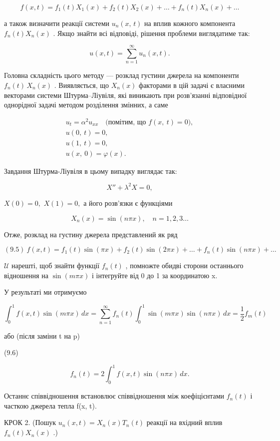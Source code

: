 \documentclass[
  ukrainian,
]{article}
\begin{document}
\[
f(x, t) = f_1(t) X_1(x) + f_2(t) X_2(x) + \dots + f_n(t) X_n(x) + \dots
\]

а також визначити реакції системи \(u_n\left(x,\,t\right)\) на вплив
кожного компонента \(f_n\left(t\right)X_n\left(x\right)\) . Якщо знайти
всі відповіді, рішення проблеми виглядатиме так:

\[
u(x, t) = \sum_{n=1}^{\infty} u_n(x, t).
\]

Головна складність цього методу --- розклад густини джерела на
компоненти \(f_n(t)\,X_n(x)\) . Виявляється, що \(X_n(x)\) факторами в
цій задачі є власними векторами системи Штурма--Ліувіля, які виникають
при розв'язанні відповідної однорідної задачі методом розділення
змінних, а саме

\[
\begin{array}{c} u_t = \alpha^2 u_{xx} \quad \text{(помітим, що } f(x, \ t) = 0), \\ u(0, \ t) = 0, \\ u(1, \ t) = 0, \\ u(x, \ 0) = \varphi(x). \end{array}
\]

Завдання Штурма-Ліувіля в цьому випадку виглядає так:

\[
X'' + \lambda^2 X = 0,
\]

\(X(0) = 0,\) \(X(1) = 0,\) а його розв'язки є функціями

\[
X_n(x) = \sin(n\pi x), \quad n = 1, 2, 3 \dots
\]

Отже, розклад на густину джерела представлений як ряд

\[
(9.5) \ f(x,t) = f_1(t) \sin(\pi x) + f_2(t) \sin(2\pi x) + \dots + f_n(t) \sin(n\pi x) + \dots
\]

\(\mathcal{U}\) нарешті, щоб знайти функції \(f_n(t)\) , помножте обидві
сторони останнього відношення на \(\sin(m\pi x)\) і інтегруйте від 0 до
1 за координатою x.

У результаті ми отримуємо

\[
\int_{0}^{1} f(x, t) \sin(m\pi x)\,dx = \sum_{n=1}^{\infty} f_{n}(t) \int_{0}^{1} \sin(m\pi x) \sin(n\pi x)\,dx = \frac{1}{2} f_{m}(t)
\]

або (після заміни t на p)

(9.6)

\[
f_{n}(t) = 2 \int_{0}^{1} f(x, t) \sin(n\pi x)\,dx.
\]

Останнє співвідношення встановлює співвідношення між коефіцієнтами
\(f_n(t)\) і часткою джерела тепла f(x, t).

КРОК 2. (Пошук \(u_n(x, t) = X_n(x) T_n(t)\) реакції на вхідний вплив
\(f_n(t) X_n(x)\) .)
\end{document}
